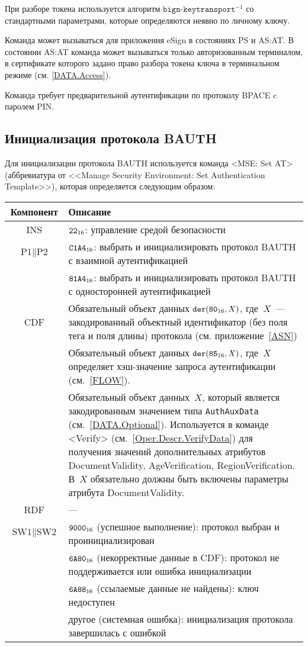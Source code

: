 При разборе токена используется алгоритм $\texttt{bign-keytransport}^{-1}$
со стандартными параметрами, которые определяются неявно
по личному ключу. 

Команда может вызываться для приложения eSign в 
состояниях PS и AS:AT. В состоянии AS:AT команда 
может вызываться только авторизованным терминалом,
в сертификате которого задано право 
разбора токена ключа в терминальном режиме 
(см. \ref{DATA.Access}).

Команда требует предварительной аутентификации по 
протоколу BPACE c паролем PIN. 

\subsection{Инициализация протокола BAUTH}
\label{Oper.Descr.SetBAUTH}

Для инициализации протокола BAUTH используется
команда <MSE: Set AT> 
(аббревиатура от <<Manage Security Environment: Set 
Authentication Template>>), 
которая определяется следующим образом:

\noindent
\begin{tabular}{|c|p{14cm}|}
\hline
Компонент & Описание \\
\hline
\hline
INS & $\texttt{22}_{16}$: управление средой безопасности\\ 
\hline
$\text{P1} \parallel\text{P2}$ & $\texttt{C1A4}_{16}$: выбрать и 
инициализировать протокол BAUTH с взаимной 
аутентификацией\\ 
 & $\texttt{81A4}_{16}$: выбрать и инициализировать протокол BAUTH с 
односторонней аутентификацией\\
\hline
CDF & Обязательный объект данных 
$\texttt{der}(\texttt{80}_{16}, X)$, где~$X$~--- 
закодированный объектный идентификатор (без поля тега и поля 
длины) протокола (см. приложение~\ref{ASN})\\
 & Обязательный объект данных $\texttt{der}(\texttt{85}_{16}, X)$, 
где~$X$ определяет хэш-значение запроса аутентификации (см.~\ref{FLOW}).\\
 & Обязательный объект данных~$X$, который является 
закодированным значением типа \verb|AuthAuxData| (см.~\ref{DATA.Optional}). 
Используется в команде <Verify> (см.~\ref{Oper.Descr.VerifyData}) 
для получения значений дополнительных атрибутов DocumentValidity, 
AgeVerification, RegionVerification. В~$X$ 
обязательно должны быть включены параметры атрибута DocumentValidity.\\
\hline \hline
RDF &  --- \\
\hline
$\text{SW1} \parallel \text{SW2}$ & 
$\texttt{9000}_{16}$ (успешное выполнение): протокол выбран и 
проинициализирован \\
 & $\texttt{6A80}_{16}$ (некорректные данные в CDF): протокол не поддерживается или 
ошибка инициализации \\
 & $\texttt{6A88}_{16}$ (ссылаемые данные не найдены): ключ недоступен \\
 & другое (системная ошибка): инициализация протокола завершилась с 
ошибкой\\
\hline
\end{tabular}

